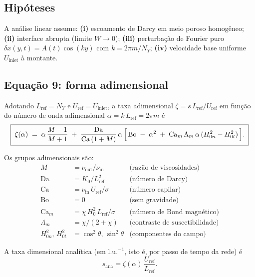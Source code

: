 \documentclass[11pt,a4paper]{article}
\newcommand{\Da}{\mathrm{Da}}
\newcommand{\Ca}{\mathrm{Ca}}
\newcommand{\Bo}{\mathrm{Bo}}
\newcommand{\Cam}{\mathrm{Ca}_m}
\newcommand{\Lref}{L_{\mathrm{ref}}}
\newcommand{\Uref}{U_{\mathrm{ref}}}
\begin{document}
\subsection{Hipóteses}

A análise linear assume: \textbf{(i)} escoamento de Darcy
em meio poroso homogêneo; \textbf{(ii)} interface abrupta (limite
$W\to 0$); \textbf{(iii)} perturbação de Fourier puro $\delta x(y,t) =
A(t)\cos(ky)$ com $k = 2\pi m/N_Y$; \textbf{(iv)} velocidade base
uniforme $U_{\mathrm{inlet}}$ à montante.

\subsection{Equação 9: forma adimensional}

Adotando $\Lref = N_Y$ e $\Uref = U_{\mathrm{inlet}}$, a taxa adimensional
$\zeta = s\,\Lref/\Uref$ em função do número de onda adimensional
$\alpha = k\,\Lref = 2\pi m$ é
\begin{equation}
    \boxed{\;
    \zeta(\alpha) \;=\;
    \alpha\,\frac{M-1}{M+1}
    \;+\;
    \frac{\Da}{\Ca\,(1+M)}\,\alpha\,
    \Bigl[\, \Bo \;-\; \alpha^2 \;+\; \Cam\,\Lambda_m\,\alpha\,(H_{0n}^2 - H_{0t}^2)\,\Bigr].
    \;}
    \label{eq:zeta}
\end{equation}

Os grupos adimensionais são:
\begin{align}
    M    &= \nu_{\mathrm{out}}/\nu_{\mathrm{in}}
    & \text{(razão de viscosidades)} \\
    \Da  &= K_0/\Lref^2
    & \text{(número de Darcy)} \\
    \Ca  &= \nu_{\mathrm{in}}\,\Uref / \sigma
    & \text{(número capilar)} \\
    \Bo  &= 0
    & \text{(sem gravidade)} \\
    \Cam &= \chi\,H_0^2\,\Lref / \sigma
    & \text{(número de Bond magnético)} \\
    \Lambda_m &= \chi/(2+\chi)
    & \text{(contraste de suscetibilidade)} \\
    H_{0n}^2,\,H_{0t}^2 &= \cos^2\theta,\,\sin^2\theta
    & \text{(componentes do campo)}
\end{align}

A taxa dimensional analítica (em $\mathrm{l.u.}^{-1}$, isto é, por
passo de tempo da rede) é
\begin{equation}
    s_{\mathrm{ana}} = \zeta(\alpha)\,\frac{\Uref}{\Lref}.
    \label{eq:sana}
\end{equation}
\end{document}
